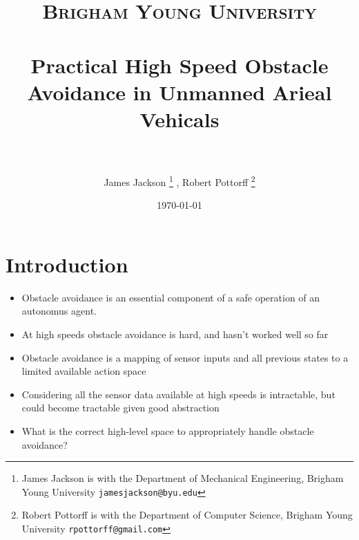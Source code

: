 \documentclass[paper=a4, fontsize=11pt]{scrartcl} %
\title{
\normalfont \normalsize
\textsc{Brigham Young University} \\ [25pt] %
\horrule{0.5pt} \\[0.4cm] %
\huge Practical High Speed Obstacle Avoidance in Unmanned Arieal Vehicals\\ %
\horrule{2pt} \\[0.5cm] %
}
\author{James Jackson%
\thanks{James Jackson is with the Department of Mechanical Engineering, Brigham Young University
        {\tt\small jamesjackson@byu.edu}}%
        , Robert Pottorff
\thanks{Robert Pottorff is with the Department of Computer Science, Brigham Young University
        {\tt\small rpottorff@gmail.com}}%
}
\date{\normalsize\today} %
\begin{document}
\maketitle %


\section{Introduction}

\begin{itemize}
	\item Obstacle avoidance is an essential component of a safe operation of an autonomus agent.
	\item At high speeds obstacle avoidance is hard, and hasn't worked well so far
\end{itemize}
	
\begin{itemize}
	\item Obstacle avoidance is a mapping of sensor inputs and all previous states to a limited available action space
	\item Considering all the sensor data available at high speeds is intractable, but could become tractable given good abstraction
	\item What is the correct high-level space to appropriately handle obstacle avoidance?
\end{itemize}
	
\end{document}

